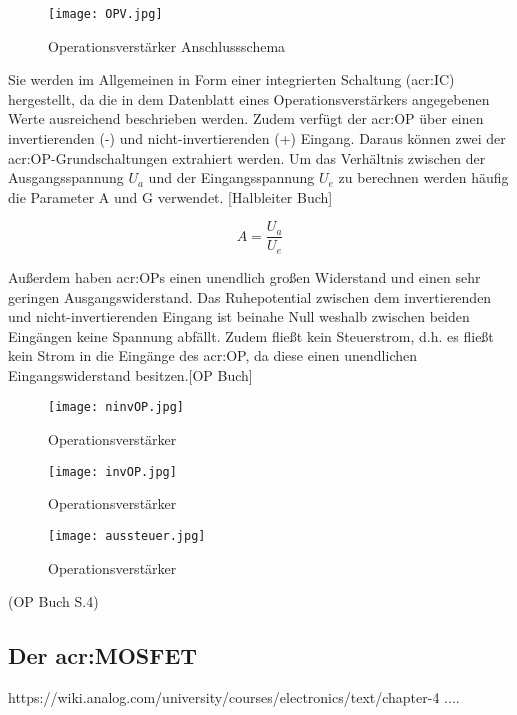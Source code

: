 \begin{figure}[H]
	\centering
	\texttt{[image: OPV.jpg]}
	\caption[Operationsverstärker Anschlussschema]{Operationsverstärker Anschlussschema} 
	\cite{Eigen}
	\label{fig:OPV}
\end{figure}

Sie werden im Allgemeinen in Form einer integrierten Schaltung (\gls{acr:IC}) hergestellt, da die in dem Datenblatt eines Operationsverstärkers angegebenen Werte ausreichend beschrieben werden. Zudem verfügt der \gls{acr:OP} über einen invertierenden (-) und nicht-invertierenden (+) Eingang. Daraus können zwei der \gls{acr:OP}-Grundschaltungen extrahiert werden. Um das Verhältnis zwischen der Ausgangsspannung $U_{a}$ und der Eingangsspannung $U_{e}$ zu berechnen werden häufig die Parameter A und G verwendet. [Halbleiter Buch]

\begin{equation}
	\label{equ:bsp1}
	A = \frac{U_{a}}{U_{e}}
\end{equation}

Außerdem haben \gls{acr:OP}s einen unendlich großen Widerstand und einen sehr geringen Ausgangswiderstand.
Das Ruhepotential zwischen dem invertierenden und nicht-invertierenden Eingang ist beinahe Null weshalb zwischen beiden Eingängen keine Spannung abfällt. Zudem fließt kein Steuerstrom, d.h. es fließt kein Strom in die Eingänge des \gls{acr:OP}, da diese einen unendlichen Eingangswiderstand besitzen.[OP Buch]


\begin{figure}[H]
	\centering
	\texttt{[image: ninvOP.jpg]}
	\caption[Operationsverstärker]{Operationsverstärker} 
	\cite{Eigen}
	\label{fig:ninvOP}
\end{figure}

\begin{figure}[H]
	\centering
	\texttt{[image: invOP.jpg]}
	\caption[Operationsverstärker]{Operationsverstärker} 
	\cite{Eigen}
	\label{fig:invOP}
\end{figure}

\begin{figure}[H]
	\centering
	\texttt{[image: aussteuer.jpg]}
	\caption[Operationsverstärker]{Operationsverstärker} 
	\cite{Eigen}
	\label{fig:aussteuer}
\end{figure} (OP Buch S.4)


\newpage
\subsection{Der \gls{acr:MOSFET}}
\label{subsec:Unterabschnitt12}
https://wiki.analog.com/university/courses/electronics/text/chapter-4 ....


